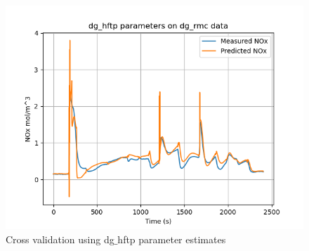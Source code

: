 \begin{figure}[H]
\begin{minipage}{0.33\textwidth}
                \includegraphics[width = \textwidth]{./figs/figs_new_mdl/dg_hftp_dg_rmc.png}
        \end{minipage}
        \caption{Cross validation using dg$\_$hftp parameter estimates}
\end{figure}

